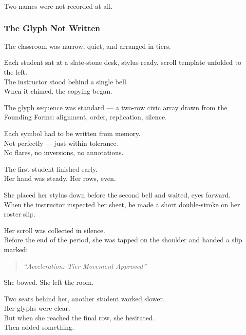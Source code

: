 \documentclass[12pt]{article}
\begin{document}
Two names were not recorded at all.

\dotfill

\subsubsection{The Glyph Not Written}

The classroom was narrow, quiet, and arranged in tiers.

Each student sat at a slate-stone desk, stylus ready, scroll template unfolded to the left.\\
The instructor stood behind a single bell.\\
When it chimed, the copying began.

\vspace{1em}

The glyph sequence was standard — a two-row civic array drawn from the Founding Forms: alignment, order, replication, silence.

Each symbol had to be written from memory.\\
Not perfectly — just within tolerance.\\
No flares, no inversions, no annotations.

\vspace{1em}

The first student finished early.\\
Her hand was steady. Her rows, even.

She placed her stylus down before the second bell and waited, eyes forward.\\
When the instructor inspected her sheet, he made a short double-stroke on her roster slip.

Her scroll was collected in silence.\\
Before the end of the period, she was tapped on the shoulder and handed a slip marked:

\begin{quote}
\textit{“Acceleration: Tier Movement Approved”}
\end{quote}

She bowed. She left the room.

\vspace{1em}

Two seats behind her, another student worked slower.\\
Her glyphs were clear.\\
But when she reached the final row, she hesitated.\\
Then added something.
\end{document}

